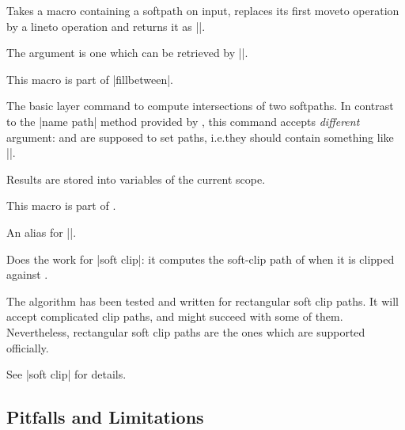 \begin{command}{\pgfpathreplacefirstmoveto{}}
    Takes a macro containing a softpath on input, replaces its first moveto
    operation by a lineto operation and returns it as |\pgfretval|.

    The argument  is one which can be
    retrieved by |\pgfgetpath|.

    This macro is part of |fillbetween|.
\end{command}

\begin{command}{\pgfintersectionofpaths{}}
    The \pgfname{} basic layer command to compute intersections of two
    softpaths. In contrast to the |name path| method provided by \tikzname,
    this command accepts \emph{different} argument:  and
     are supposed to set paths, i.e.\@ they should contain
    something like |\pgfsetpath{\somesoftpath}|.

    Results are stored into variables of the current scope.

    This macro is part of \pgfname{}.
\end{command}

\begin{command}{\tikzpathintersectionsegments{}}
    An alias for ||.
\end{command}

\begin{command}{\pgfpathcomputesoftclippath{}}
    Does the work for |soft clip|: it computes the soft-clip path of
     when it is clipped against
    .

    The algorithm has been tested and written for rectangular soft clip paths.
    It will accept complicated clip paths, and might succeed with some of them.
    Nevertheless, rectangular soft clip paths are the ones which are supported
    officially.

    See |soft clip| for details.
\end{command}


\subsection{Pitfalls and Limitations}

